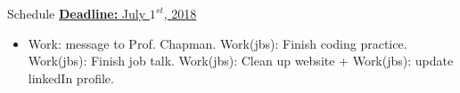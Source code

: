 
\begin{frame}{Schedule} 
\underline{\textbf{Deadline:} July $1^{st}$, 2018} 
\begin{itemize} 

\item Work: message to Prof. Chapman. 
\pitem Work(jbs): Finish coding practice. 
\pitem Work(jbs): Finish job talk. 
\pitem Work(jbs): Clean up website +  Work(jbs): update linkedIn
profile. 

\end{itemize} 
\end{frame} 

